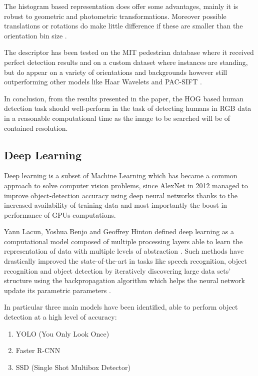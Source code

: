 The histogram based representation does offer some advantages, mainly it is robust to geometric and photometric transformations. Moreover possible translations or rotations do make little difference if these are smaller than the orientation bin size \cite{paper:dalal2005histograms}.

The descriptor has been tested on the MIT pedestrian database \cite{paper:dalal2005histograms} where it received  perfect detection results and on a custom dataset where instances are standing, but do appear on a variety of orientations and backgrounds however still outperforming other models like Haar Wavelets and PAC-SIFT \cite{paper:dalal2005histograms}.

In conclusion, from the results presented in the paper, the HOG based human detection task should well-perform in the task of detecting humans in RGB data in a reasonable computational time as the image to be searched will be of contained resolution.

\subsection{Deep Learning}

Deep learning is a subset of Machine Learning which has became a common approach to solve computer vision problems, since AlexNet in 2012 managed to improve object-detection accuracy using deep neural networks thanks to the increased availability of training data and most importantly the boost in performance of GPUs computations.

Yann Lacun, Yoshua Benjo and Geoffrey Hinton defined deep learning as a computational model composed of multiple processing layers able to learn the representation of data with multiple levels of abstraction \cite{paper:lecun2015deep}. Such methods have drastically improved the state-of-the-art in tasks like speech recognition, object recognition and object detection by iteratively discovering large data sets' structure using the backpropagation algorithm which helps the neural network update its parametric parameters \cite{paper:lecun2015deep}.

In particular three main models have been identified, able to perform object detection at a high level of accuracy:

\begin{enumerate}
  \item YOLO (You Only Look Once) \cite{paper:YOLO}
  \item Faster R-CNN \cite{paper:FRCNN}
  \item SSD (Single Shot Multibox Detector) \cite{paper:SSD}
\end{enumerate}


